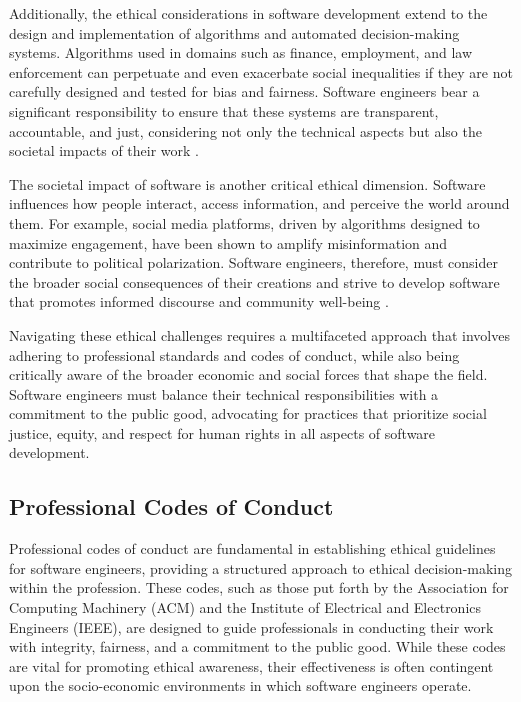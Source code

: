 \begin{refsection}
Additionally, the ethical considerations in software development extend to the design and implementation of algorithms and automated decision-making systems. Algorithms used in domains such as finance, employment, and law enforcement can perpetuate and even exacerbate social inequalities if they are not carefully designed and tested for bias and fairness. Software engineers bear a significant responsibility to ensure that these systems are transparent, accountable, and just, considering not only the technical aspects but also the societal impacts of their work \cite[pp.~93-95]{o2016weapons}.

The societal impact of software is another critical ethical dimension. Software influences how people interact, access information, and perceive the world around them. For example, social media platforms, driven by algorithms designed to maximize engagement, have been shown to amplify misinformation and contribute to political polarization. Software engineers, therefore, must consider the broader social consequences of their creations and strive to develop software that promotes informed discourse and community well-being \cite[pp.~142-144]{vaidhyanathan2019antisocial}.

Navigating these ethical challenges requires a multifaceted approach that involves adhering to professional standards and codes of conduct, while also being critically aware of the broader economic and social forces that shape the field. Software engineers must balance their technical responsibilities with a commitment to the public good, advocating for practices that prioritize social justice, equity, and respect for human rights in all aspects of software development.

\subsection{Professional Codes of Conduct}

Professional codes of conduct are fundamental in establishing ethical guidelines for software engineers, providing a structured approach to ethical decision-making within the profession. These codes, such as those put forth by the Association for Computing Machinery (ACM) and the Institute of Electrical and Electronics Engineers (IEEE), are designed to guide professionals in conducting their work with integrity, fairness, and a commitment to the public good. While these codes are vital for promoting ethical awareness, their effectiveness is often contingent upon the socio-economic environments in which software engineers operate.


\end{refsection}
